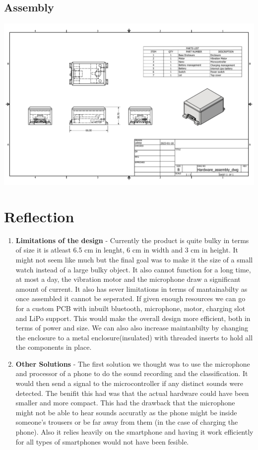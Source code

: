 \documentclass[12pt, titlepage]{article}
\begin{document}
\begin{appendices}
\subsection{Assembly}
	\label{appendix:hardware:assembly}

  \includegraphics[width=\textwidth,height=\textheight,keepaspectratio]{Assembly_drawing.pdf}

  \section{Reflection}
  \label{appendix:reflection}
  
  
  \begin{enumerate}
    \item \textbf{Limitations of the design} - Currently the product is quite bulky in terms of size it is atleast 6.5 cm in lenght, 6 cm in width and 3 cm in height. It might not seem like much but the final goal was to make it the size of a small watch instead of a large bulky object. It also cannot function for a long time, at most a day, the vibration motor and the microphone draw a significant amount of current. It also has sever limitations in terms of mantainabilty as once assembled it cannot be seperated.  If given enough resources we can go for a custom PCB with inbuilt bluetooth, microphone, motor, charging slot and LiPo support. This would make the overall design more efficient, both in terms of power and size. We can also also increase maintanbilty by changing the enclosure to a metal enclosure(insulated) with threaded inserts to hold all the components in place.       
    \item \textbf{Other Solutions} - The first solution we thought was to use the microphone and processor of a phone to do the sound recording and the classification. It would then send a signal to the microcontroller if any distinct sounds were detected. The benifit this had was that the actual hardware could have been smaller and more compact. This had the drawback that the microphone might not be able to hear sounds accuratly as the phone might be inside someone's trousers or be far away from them (in the case of charging the phone). Also it relies heavily on the smartphone and having it work efficiently for all types of smartphones would not have been fesible. 


\end{enumerate}
\end{appendices}
\end{document}
